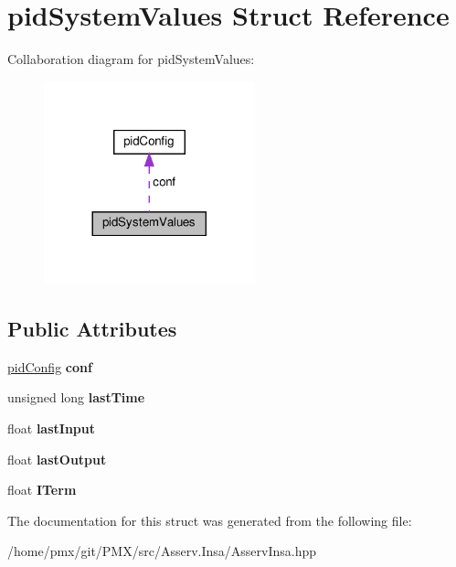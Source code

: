 \hypertarget{structpidSystemValues}{}\section{pid\+System\+Values Struct Reference}
\label{structpidSystemValues}


Collaboration diagram for pid\+System\+Values\+:
\nopagebreak
\begin{figure}[H]
\begin{center}
\leavevmode
\includegraphics[width=173pt]{structpidSystemValues__coll__graph}
\end{center}
\end{figure}
\subsection*{Public Attributes}
\begin{DoxyCompactItemize}
\item 
\mbox{\label{structpidSystemValues_a1fc548635e30318af2f83d152dab8248}} 
\hyperlink{structpidConfig}{pid\+Config} {\bfseries conf}
\item 
\mbox{\label{structpidSystemValues_a9eceb99b1b5023d1377bec598d7004dc}} 
unsigned long {\bfseries last\+Time}
\item 
\mbox{\label{structpidSystemValues_a132b0bf48beb315b3f2eb0c56a38c96f}} 
float {\bfseries last\+Input}
\item 
\mbox{\label{structpidSystemValues_a8c9bd5633acdce5829785d76752f50eb}} 
float {\bfseries last\+Output}
\item 
\mbox{\label{structpidSystemValues_a0058f54532175812e1f975aaddc9ed47}} 
float {\bfseries I\+Term}
\end{DoxyCompactItemize}


The documentation for this struct was generated from the following file\+:\begin{DoxyCompactItemize}
\item 
/home/pmx/git/\+P\+M\+X/src/\+Asserv.\+Insa/Asserv\+Insa.\+hpp\end{DoxyCompactItemize}
